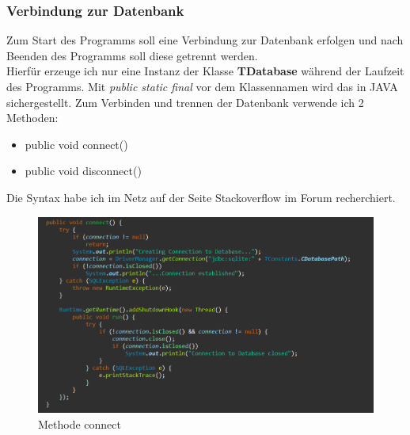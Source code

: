 \subsubsection{Verbindung zur Datenbank}
Zum Start des Programms soll eine Verbindung zur Datenbank erfolgen und nach Beenden des Programms soll diese getrennt werden.\\
Hierfür erzeuge ich nur eine Instanz der Klasse \textbf{TDatabase} während der Laufzeit des Programms. Mit \textit{public static final} vor dem Klassennamen wird das in JAVA sichergestellt. Zum Verbinden und trennen der Datenbank verwende ich 2 Methoden:
\begin{itemize}
\item{public void connect(){}}
\item{public void disconnect() {}}
\end{itemize}
Die Syntax habe ich im Netz auf der Seite Stackoverflow im Forum recherchiert.
\begin{figure}[h]
\begin{center}
\includegraphics[width=15cm]{img/connect.png}
\caption{Methode connect}
\label{connect}
\end{center}
\end{figure}
